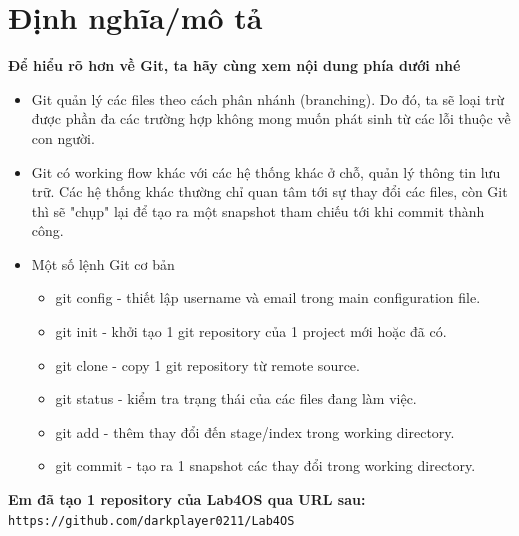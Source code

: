 \documentclass[a4paper]{article}
\begin{document}
	\section{Định nghĩa/mô tả}
	\textbf{Để hiểu rõ hơn về Git, ta hãy cùng xem nội dung phía dưới nhé}
	\\
	\begin{itemize}
		\item Git quản lý các files theo cách phân nhánh (branching). Do đó, ta sẽ loại trừ được phần đa các trường hợp không mong muốn phát sinh từ các lỗi thuộc về con người.
		\item Git có working flow khác với các hệ thống khác ở chỗ, quản lý thông tin lưu trữ. Các hệ thống khác thường chỉ quan tâm tới sự thay đổi các files, còn Git thì sẽ "chụp" lại để tạo ra một snapshot tham chiếu tới khi commit thành công.
		\item Một số lệnh Git cơ bản
		\begin{itemize}
			\item git config - thiết lập username và email trong main configuration file.
			\item git init - khởi tạo 1 git repository của 1 project mới hoặc đã có.
			\item git clone - copy 1 git repository từ remote source.
			\item git status - kiểm tra trạng thái của các files đang làm việc.
			\item git add - thêm thay đổi đến stage/index trong working directory.
			\item git commit - tạo ra 1 snapshot các thay đổi trong working directory.
		\end{itemize}
	\end{itemize}
	\textbf{Em đã tạo 1 repository của Lab4OS qua URL sau:} \\\texttt{https://github.com/darkplayer0211/Lab4OS}
\end{document}
